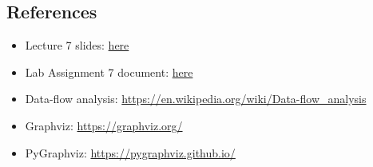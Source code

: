 \subsection{References}
\begin{itemize}[itemsep=0em, topsep=0pt]
    \item Lecture 7 slides: \href{https://drive.google.com/file/d/1cMLqFTzRJcpvq8iTEL4XV0K9BclsALzE/view}{here}
    \item Lab Assignment 7 document: \href{https://drive.google.com/file/d/1x6MDZ6e2PJ0MFn6u2U8NPzMxtcuhOy2t/view}{here}
    \item Data-flow analysis: \url{https://en.wikipedia.org/wiki/Data-flow_analysis}
    \item Graphviz: \url{https://graphviz.org/}
    \item PyGraphviz: \url{https://pygraphviz.github.io/}
\end{itemize}